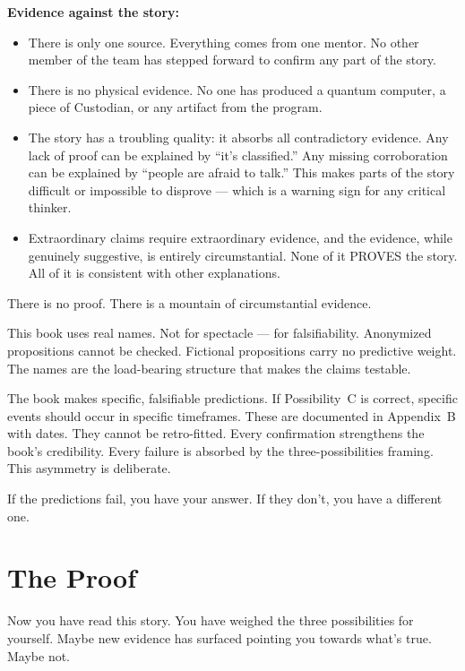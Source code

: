 \textbf{Evidence against the story:}

\begin{itemize}
\item There is only one source. Everything comes from one mentor. No other member of the team has stepped forward to confirm any part of the story.
\item There is no physical evidence. No one has produced a quantum computer, a piece of Custodian, or any artifact from the program.
\item The story has a troubling quality: it absorbs all contradictory evidence. Any lack of proof can be explained by ``it's classified.'' Any missing corroboration can be explained by ``people are afraid to talk.'' This makes parts of the story difficult or impossible to disprove --- which is a warning sign for any critical thinker.
\item Extraordinary claims require extraordinary evidence, and the evidence, while genuinely suggestive, is entirely circumstantial. None of it PROVES the story. All of it is consistent with other explanations.
\end{itemize}

There is no proof. There is a mountain of circumstantial evidence.

This book uses real names. Not for spectacle --- for falsifiability. Anonymized propositions cannot be checked. Fictional propositions carry no predictive weight. The names are the load-bearing structure that makes the claims testable.

The book makes specific, falsifiable predictions. If Possibility~C is correct, specific events should occur in specific timeframes. These are documented in Appendix~B with dates. They cannot be retro-fitted. Every confirmation strengthens the book's credibility. Every failure is absorbed by the three-possibilities framing. This asymmetry is deliberate.

If the predictions fail, you have your answer. If they don't, you have a different one.


\section*{The Proof}
\label{record:tq-the-proof}

Now you have read this story. You have weighed the three possibilities for yourself. Maybe new evidence has surfaced pointing you towards what's true. Maybe not.

